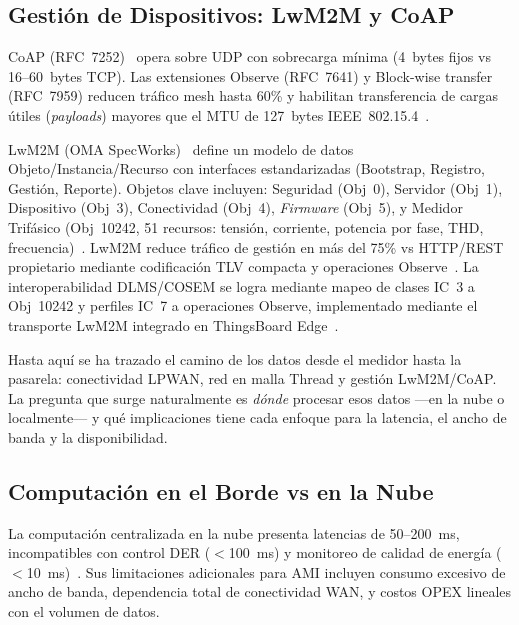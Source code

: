 \subsection{Gestión de Dispositivos: LwM2M y CoAP}
\label{sec:marco-lwm2m-coap}

CoAP (RFC~7252)~\cite{RFC7252} opera sobre UDP con sobrecarga mínima (4~bytes fijos vs 16--60~bytes TCP). Las extensiones Observe (RFC~7641) y Block-wise transfer (RFC~7959) reducen tráfico mesh hasta 60\% y habilitan transferencia de cargas útiles (\emph{payloads}) mayores que el MTU de 127~bytes IEEE~802.15.4~\cite{amezcuavaldovinosDesignImplementationEvaluation2024}.

LwM2M (OMA SpecWorks)~\cite{OMA_LwM2M2020} define un modelo de datos Objeto/Instancia/Recurso con interfaces estandarizadas (Bootstrap, Registro, Gestión, Reporte). Objetos clave incluyen: Seguridad (Obj~0), Servidor (Obj~1), Dispositivo (Obj~3), Conectividad (Obj~4), \emph{Firmware} (Obj~5), y Medidor Trifásico (Obj~10242, 51 recursos: tensión, corriente, potencia por fase, THD, frecuencia)~\cite{karaagacLightweightM2MSurvey2018,OMA_LwM2M_Registry_10242}. LwM2M reduce tráfico de gestión en más del 75\% vs HTTP/REST propietario mediante codificación TLV compacta y operaciones Observe~\cite{karaagacLightweightM2MSurvey2018}. La interoperabilidad DLMS/COSEM se logra mediante mapeo de clases IC~3 a Obj~10242 y perfiles IC~7 a operaciones Observe, implementado mediante el transporte LwM2M integrado en ThingsBoard Edge~\cite{dlmsLwM2MIntegration2024}.

Hasta aquí se ha trazado el camino de los datos desde el medidor hasta la pasarela: conectividad LPWAN, red en malla Thread y gestión LwM2M/CoAP. La pregunta que surge naturalmente es \textit{dónde} procesar esos datos ---en la nube o localmente--- y qué implicaciones tiene cada enfoque para la latencia, el ancho de banda y la disponibilidad.

\subsection{Computación en el Borde vs en la Nube}
\label{sec:edge-vs-cloud}

La computación centralizada en la nube presenta latencias de 50--200~ms, incompatibles con control DER ($<$100~ms) y monitoreo de calidad de energía ($<$10~ms)~\cite{andriuloEdgeComputingCloud2024,IEEERecommendedPractice}. Sus limitaciones adicionales para AMI incluyen consumo excesivo de ancho de banda, dependencia total de conectividad WAN, y costos OPEX lineales con el volumen de datos.

